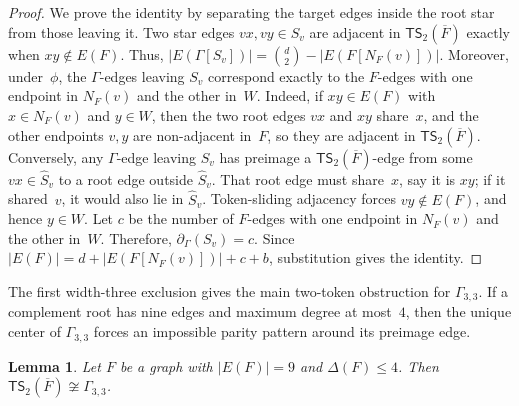\documentclass[a4paper]{article}
\theoremstyle{plain}
\newtheorem{lemma}[lemma]{Lemma}
\theoremstyle{definition}
\newcommand{\TSsym}{\mathsf{TS}}
\numberwithin{equation}{section}
\begin{document}
\begin{proof}
We prove the identity by separating the target edges inside the root star from those leaving it.
Two star edges $vx,vy\in \widehat S_v$ are adjacent in $\TSsym_2(\overline{F})$ exactly when $xy\notin E(F)$.
Thus, $\displaystyle |E(\Gamma[S_v])|=\binom d2-|E(F[N_F(v)])|$.
Moreover, under~$\phi$, the $\Gamma$-edges leaving $S_v$ correspond exactly to the $F$-edges with one endpoint in $N_F(v)$ and the other in~$W$.
Indeed, if $xy\in E(F)$ with $x\in N_F(v)$ and $y\in W$, then the two root edges $vx$ and $xy$ share~$x$, and the other endpoints $v,y$ are non-adjacent in~$F$, so they are adjacent in $\TSsym_2(\overline{F})$.
Conversely, any $\Gamma$-edge leaving $S_v$ has preimage a $\TSsym_2(\overline{F})$-edge from some $vx\in\widehat S_v$ to a root edge outside $\widehat S_v$.
That root edge must share~$x$, say it is $xy$; if it shared~$v$, it would also lie in $\widehat S_v$.
Token-sliding adjacency forces $vy\notin E(F)$, and hence $y\in W$.
Let $c$ be the number of $F$-edges with one endpoint in $N_F(v)$ and the other in~$W$.
Therefore, $\partial_\Gamma(S_v)=c$.
Since $|E(F)|=d+|E(F[N_F(v)])|+c+b$, substitution gives the identity.
\end{proof}

The first width-three exclusion gives the main two-token obstruction for $\Gamma_{3,3}$.
If a complement root has nine edges and maximum degree at most~$4$, then the unique center of $\Gamma_{3,3}$ forces an impossible parity pattern around its preimage edge.

\begin{lemma}
\label{lem:no33-center-obstruction}
Let $F$ be a graph with $|E(F)|=9$ and $\Delta(F)\le 4$.
Then $\TSsym_2(\overline{F})\not\cong \Gamma_{3,3}$.
\end{lemma}
\end{document}
